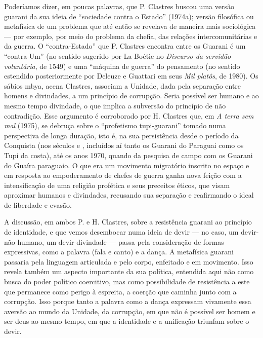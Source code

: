 {{Poderíamos dizer, em poucas palavras, que P. Clastres buscou uma versão
guarani da sua ideia de ``sociedade contra o Estado'' (1974a); versão
filosófica ou metafísica de um problema que até então se revelava de
maneira mais sociológica --- por exemplo, por meio do problema da chefia,
das relações intercomunitárias e da guerra. O ``contra-Estado'' que P.
Clastres encontra entre os Guarani é um ``contra-Um'' (no sentido
sugerido por La Boétie no \emph{Discurso da servidão voluntária}, de 1549) e
uma ``máquina de guerra'' do pensamento (no sentido estendido
posteriormente por Deleuze e Guattari em seus \emph{Mil platôs}, de 1980). Os
sábios mbya, acena Clastres, associam a Unidade, dada pela separação
entre homens e divindades, a um princípio de corrupção. Seria possível
ser humano e ao mesmo tempo divindade, o que implica a subversão do
princípio de não contradição. Esse argumento é corroborado por H.
Clastres que, em \emph{A terra sem mal} (1975), se debruça sobre o ``profetismo
tupi-guarani'' tomado numa perspectiva de longa duração, isto é, na sua
persistência desde o período da Conquista (nos séculos  e ,
incluídos aí tanto os Guarani do Paraguai como os Tupi da costa), até
os anos 1970, quando da pesquisa de campo com os Guarani do Guaíra
paraguaio. O que era um movimento migratório inscrito no espaço e em
resposta ao empoderamento de chefes de guerra ganha nova feição com a
intensificação de uma religião profética e seus preceitos éticos, que
visam aproximar humanos e divindades, recusando sua separação e
reafirmando o ideal de liberdade e evasão.

A discussão, em ambos P. e H. Clastres, sobre a resistência guarani ao
princípio de identidade, e que vemos desembocar numa ideia de devir ---
no caso, um devir-não humano, um devir-divindade --- passa pela
consideração de formas expressivas, como a palavra (fala e canto) e a
dança. A metafísica guarani passaria pela linguagem articulada e pelo
corpo, enfeitado e em movimento. Isso revela também um aspecto
importante da sua política, entendida aqui não como busca do poder
político coercitivo, mas como possibilidade de resistência a este que
permanece como perigo à espreita, a coerção que caminha junto com a
corrupção. Isso porque tanto a palavra como a dança expressam vivamente
essa aversão ao mundo da Unidade, da corrupção, em que não é possível
ser homem e ser deus ao mesmo tempo, em que a identidade e a unificação
triunfam sobre o devir. 

}}
